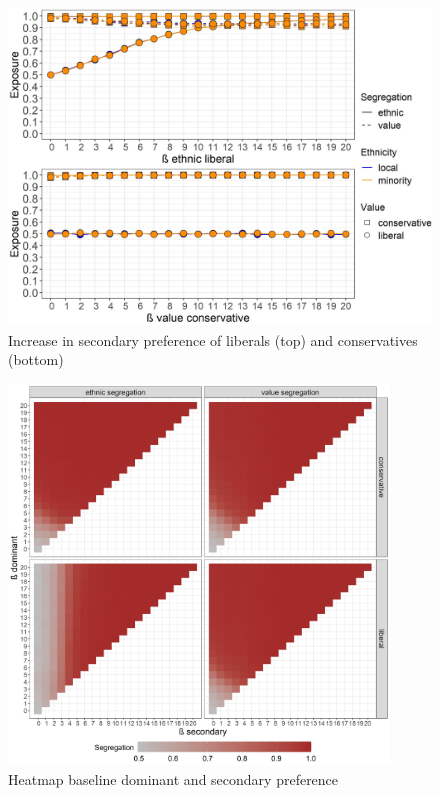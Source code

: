 \documentclass{article}
\begin{document}
\begin{figure}[H]
    \centering
    \includegraphics[scale=0.5]{material/figures/comb_sec_bln.jpg}
    \caption{Increase in secondary preference of liberals (top) and conservatives (bottom)}
    \label{fig:comb_sec}
\end{figure} %



\begin{figure}[H]
    \centering
    \includegraphics[width=0.9\textwidth]{material/figures/heatmapbase.jpg}
    \caption{Heatmap baseline dominant and secondary preference}
    \label{fig:heatmap}
\end{figure}
\end{document}
